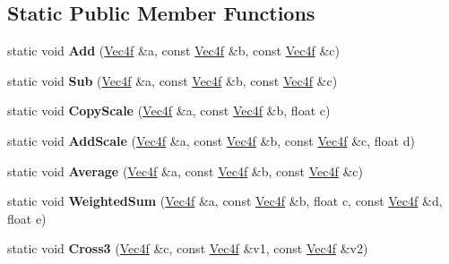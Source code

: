 \subsection*{\-Static \-Public \-Member \-Functions}
\begin{DoxyCompactItemize}
\item 
\hypertarget{classVec4f_aff7136abcf44eca7996b108b8906bedd}{static void {\bfseries \-Add} (\hyperlink{classVec4f}{\-Vec4f} \&a, const \hyperlink{classVec4f}{\-Vec4f} \&b, const \hyperlink{classVec4f}{\-Vec4f} \&c)}\label{classVec4f_aff7136abcf44eca7996b108b8906bedd}

\item 
\hypertarget{classVec4f_a21c95b9a1b2f08a4ee48e1f0e7e5c808}{static void {\bfseries \-Sub} (\hyperlink{classVec4f}{\-Vec4f} \&a, const \hyperlink{classVec4f}{\-Vec4f} \&b, const \hyperlink{classVec4f}{\-Vec4f} \&c)}\label{classVec4f_a21c95b9a1b2f08a4ee48e1f0e7e5c808}

\item 
\hypertarget{classVec4f_ac0b09b2b5c036d7b941ab45f118762eb}{static void {\bfseries \-Copy\-Scale} (\hyperlink{classVec4f}{\-Vec4f} \&a, const \hyperlink{classVec4f}{\-Vec4f} \&b, float c)}\label{classVec4f_ac0b09b2b5c036d7b941ab45f118762eb}

\item 
\hypertarget{classVec4f_a2472e737411650f15535e8326cfea1e7}{static void {\bfseries \-Add\-Scale} (\hyperlink{classVec4f}{\-Vec4f} \&a, const \hyperlink{classVec4f}{\-Vec4f} \&b, const \hyperlink{classVec4f}{\-Vec4f} \&c, float d)}\label{classVec4f_a2472e737411650f15535e8326cfea1e7}

\item 
\hypertarget{classVec4f_a64205b1fc41a26f522d90f6f19413bc7}{static void {\bfseries \-Average} (\hyperlink{classVec4f}{\-Vec4f} \&a, const \hyperlink{classVec4f}{\-Vec4f} \&b, const \hyperlink{classVec4f}{\-Vec4f} \&c)}\label{classVec4f_a64205b1fc41a26f522d90f6f19413bc7}

\item 
\hypertarget{classVec4f_a0ebe3a270ffec1f678b49807df1ae492}{static void {\bfseries \-Weighted\-Sum} (\hyperlink{classVec4f}{\-Vec4f} \&a, const \hyperlink{classVec4f}{\-Vec4f} \&b, float c, const \hyperlink{classVec4f}{\-Vec4f} \&d, float e)}\label{classVec4f_a0ebe3a270ffec1f678b49807df1ae492}

\item 
\hypertarget{classVec4f_a89dc15455e6e5373dbae79d1c8b0adff}{static void {\bfseries \-Cross3} (\hyperlink{classVec4f}{\-Vec4f} \&c, const \hyperlink{classVec4f}{\-Vec4f} \&v1, const \hyperlink{classVec4f}{\-Vec4f} \&v2)}\label{classVec4f_a89dc15455e6e5373dbae79d1c8b0adff}

\end{DoxyCompactItemize}
